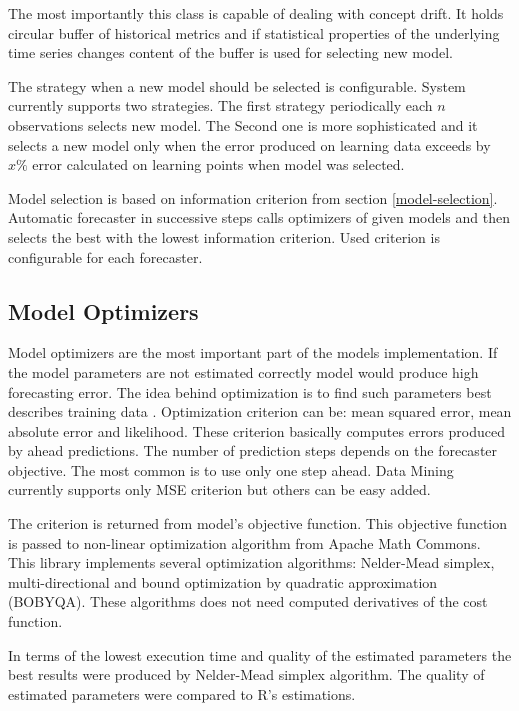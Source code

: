         The most importantly this class is capable of dealing with concept drift. It holds circular buffer of historical
        metrics and if statistical properties of the underlying time series changes content of the buffer is used for
        selecting new model.

        The strategy when a new model should be selected is configurable. System currently
        supports two strategies. The first strategy periodically each $n$ observations selects new model.
        The Second one is more sophisticated and it selects a new model only when the error produced on learning data
        exceeds by $x\%$ error calculated on learning points when model was selected.

        Model selection is based on information criterion from section \ref{model-selection}. Automatic forecaster in
        successive steps calls optimizers of given models and then selects the best with the lowest information criterion.
        Used criterion is configurable for each forecaster.

        \subsection{Model Optimizers}
        Model optimizers are the most important part of the models implementation. If the model parameters are not
        estimated correctly model would produce high forecasting error. The idea behind optimization is to find such
        parameters best describes training data \cite{hyndman-state-space}. Optimization criterion can be: mean
        squared error, mean absolute error and likelihood. These criterion basically computes errors produced by ahead
        predictions. The number of prediction steps depends on the forecaster objective. The most common is to use
        only one step ahead. Data Mining currently supports only MSE criterion but others can be easy added.

        The criterion is returned from model's objective function. This objective function is passed to non-linear
        optimization algorithm from Apache Math Commons. This library implements several optimization algorithms:
        Nelder-Mead simplex, multi-directional and bound optimization by quadratic approximation (BOBYQA). These
        algorithms
        does not need computed derivatives of the cost function.

        In terms of the lowest execution time and quality of the estimated parameters the best results were produced by
        Nelder-Mead simplex algorithm. The quality of estimated parameters were compared to R's estimations.

